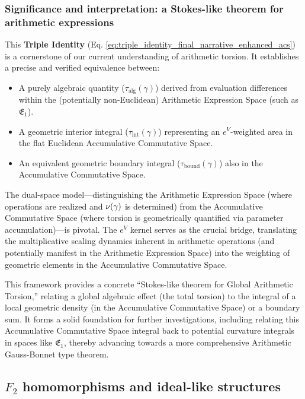 \subsubsection*{Significance and interpretation: a Stokes-like theorem for arithmetic expressions}

This \textbf{Triple Identity} (Eq. \ref{eq:triple_identity_final_narrative_enhanced_acs}) is a cornerstone of our current understanding of arithmetic torsion. It establishes a precise and verified equivalence between:
\begin{itemize}
    \item A purely algebraic quantity ($\tau_{\text{alg}}(\gamma)$) derived from evaluation differences within the (potentially non-Euclidean) Arithmetic Expression Space (such as $\mathfrak{E}_1$).
    \item A geometric interior integral ($\tau_{\text{int}}(\gamma)$) representing an $e^V$-weighted area in the flat Euclidean Accumulative Commutative Space.
    \item An equivalent geometric boundary integral ($\tau_{\text{bound}}(\gamma)$) also in the Accumulative Commutative Space.
\end{itemize}
The dual-space model---distinguishing the Arithmetic Expression Space (where operations are realized and $\nu(\gamma)$ is determined) from the Accumulative Commutative Space (where torsion is geometrically quantified via parameter accumulation)---is pivotal. The $e^V$ kernel serves as the crucial bridge, translating the multiplicative scaling dynamics inherent in arithmetic operations (and potentially manifest in the Arithmetic Expression Space) into the weighting of geometric elements in the Accumulative Commutative Space.

This framework provides a concrete ``Stokes-like theorem for Global Arithmetic Torsion,'' relating a global algebraic effect (the total torsion) to the integral of a local geometric density (in the Accumulative Commutative Space) or a boundary sum. It forms a solid foundation for further investigations, including relating this Accumulative Commutative Space integral back to potential curvature integrals in spaces like $\mathfrak{E}_1$, thereby advancing towards a more comprehensive Arithmetic Gauss-Bonnet type theorem.

\subsection{$F_2$ homomorphisms and ideal-like structures}
\label{sec:acs_algebraic_significance_revised}

